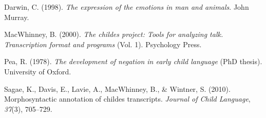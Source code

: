 \documentclass[10pt, letterpaper]{article}
\begin{document}
\leavevmode\hypertarget{ref-darwin1872expression}{}%
Darwin, C. (1998). \emph{The expression of the emotions in man and
animals}. John Murray.

\leavevmode\hypertarget{ref-macwhinney2000childes}{}%
MacWhinney, B. (2000). \emph{The childes project: Tools for analyzing
talk. Transcription format and programs} (Vol. 1). Psychology Press.

\leavevmode\hypertarget{ref-pea1978}{}%
Pea, R. (1978). \emph{The development of negation in early child
language} (PhD thesis). University of Oxford.

\leavevmode\hypertarget{ref-sagae2010morphosyntactic}{}%
Sagae, K., Davis, E., Lavie, A., MacWhinney, B., \& Wintner, S. (2010).
Morphosyntactic annotation of childes transcripts. \emph{Journal of
Child Language}, \emph{37}(3), 705--729.


\end{document}
